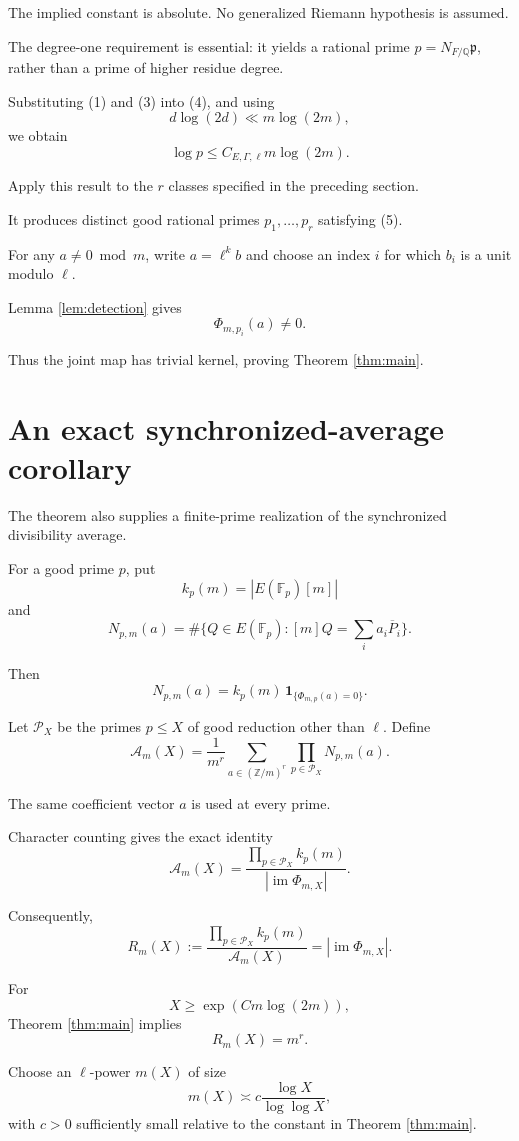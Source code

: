 \documentclass[11pt]{article}
\begin{document}
The implied constant is absolute.
No generalized Riemann hypothesis is
assumed.

The degree-one requirement is essential:
it yields a rational prime
$p=N_{F/\mathbb Q}\mathfrak p$,
rather than a prime of higher residue
degree.

Substituting (1) and (3) into (4), and
using
\[
d\log(2d)\ll m\log(2m),
\]
we obtain
\[
\boxed{
\log p\le C_{E,\Gamma,\ell}
m\log(2m).
}
\tag{5}
\]

Apply this result to the $r$ classes
specified in the preceding section.

It produces distinct good rational
primes $p_1,\ldots,p_r$ satisfying (5).

For any $a\ne0\bmod m$, write
$a=\ell^kb$ and choose an index $i$
for which $b_i$ is a unit modulo $\ell$.

Lemma \ref{lem:detection} gives
\[
\Phi_{m,p_i}(a)\ne0.
\]

Thus the joint map has trivial kernel,
proving Theorem \ref{thm:main}.

\section{An exact synchronized-average corollary}

The theorem also supplies a finite-prime
realization of the synchronized
divisibility average.

For a good prime $p$, put
\[
k_p(m)=|E(\mathbb F_p)[m]|
\]
and
\[
N_{p,m}(a)=
\#\{Q\in E(\mathbb F_p):
[m]Q=\sum_i a_i\overline P_i\}.
\]

Then
\[
N_{p,m}(a)=
k_p(m)\,
\mathbf1_{\{\Phi_{m,p}(a)=0\}}.
\]

Let $\mathcal P_X$ be the primes $p\le X$ of good reduction other than $\ell$. Define
\[
\mathcal A_m(X)=
\frac1{m^r}
\sum_{a\in(\mathbb Z/m)^r}
\prod_{p\in\mathcal P_X}
N_{p,m}(a).
\]

The same coefficient vector $a$ is used
at every prime.

Character counting gives the exact
identity
\[
\boxed{
\mathcal A_m(X)=
\frac{\displaystyle\prod_{p\in\mathcal P_X}k_p(m)}
{|\operatorname{im}\Phi_{m,X}|}.
}
\]

Consequently,
\[
R_m(X):=
\frac{\prod_{p\in\mathcal P_X}k_p(m)}
{\mathcal A_m(X)}
=
|\operatorname{im}\Phi_{m,X}|.
\]

For
\[
X\ge\exp(Cm\log(2m)),
\]
Theorem \ref{thm:main} implies
\[
\boxed{R_m(X)=m^r.}
\]

Choose an $\ell$-power $m(X)$ of size
\[
m(X)\asymp
c\frac{\log X}{\log\log X},
\]
with $c>0$ sufficiently small relative
to the constant in Theorem
\ref{thm:main}.
\end{document}
